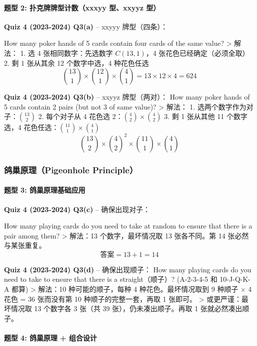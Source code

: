 \documentclass[10pt,a4paper,openany]{ctexbook}
\theoremstyle{definition}
\theoremstyle{remark}
\renewenvironment{quote}
  {\list{}{\leftmargin=1em\rightmargin=0pt\topsep=0.5pt\partopsep=0pt}\item[]}
  {\endlist}
\begin{document}
\paragraph{题型 2: 扑克牌牌型计数（xxxyy 型、xxyyz 型）}

\textbf{Quiz 4 (2023-2024) Q3(a)} -- xxyyy 牌型（四条）：
\begin{quote}
How many poker hands of 5 cards contain four cards of the same value?
>
解法：
1. 选 4 张相同数字：先选数字 $C(13,1)$，4 张花色已经确定（必须全取）
2. 剩 1 张从其余 12 个数字中选，4 种花色任选
\[
 \binom{13}{1} \times \binom{12}{1} \times \binom{4}{1} = 13 \times 12 \times 4 = 624 
\]


\textbf{Quiz 4 (2023-2024) Q3(b)} -- xxyyz 牌型（两对）：
How many poker hands of 5 cards contain 2 pairs (but not 3 of same value)?
>
解法：
1. 选两个数字作为对子：$\binom{13}{2}$
2. 每个对子从 4 花色选 2：$\binom{4}{2} \times \binom{4}{2}$
3. 剩 1 张从其他 11 个数字选，4 花色任选：$\binom{11}{1} \times \binom{4}{1}$
\[
 \binom{13}{2} \times \binom{4}{2}^2 \times \binom{11}{1} \times \binom{4}{1} 
\]


\end{quote}

\subsubsection{鸽巢原理（Pigeonhole Principle）}

\paragraph{题型 3: 鸽巢原理基础应用}

\textbf{Quiz 4 (2023-2024) Q3(c)} -- 确保出现对子：
\begin{quote}
How many playing cards do you need to take at random to ensure that there is a pair among them?
>
解法：13 个数字，最坏情况取 13 张各不同。第 14 张必然与某张重复。
\[
 \text{答案} = 13 + 1 = 14 
\]


\textbf{Quiz 4 (2023-2024) Q3(d)} -- 确保出现顺子：
How many playing cards do you need to take to ensure that there is a straight（顺子）? (A-2-3-4-5 和 10-J-Q-K-A 都算)
>
解法：10 种可能的顺子，每种 4 种花色。最坏情况取到 9 种顺子 × 4 花色 = 36 张而没有第 10 种顺子的完整一套，再取 1 张即可。
>
或更严谨：最坏情况取 13 个数字各 3 张（共 39 张），仍未凑出顺子。再取 1 张就必然凑出顺子。

\end{quote}

\paragraph{题型 4: 鸽巢原理 + 组合设计}
\end{document}
